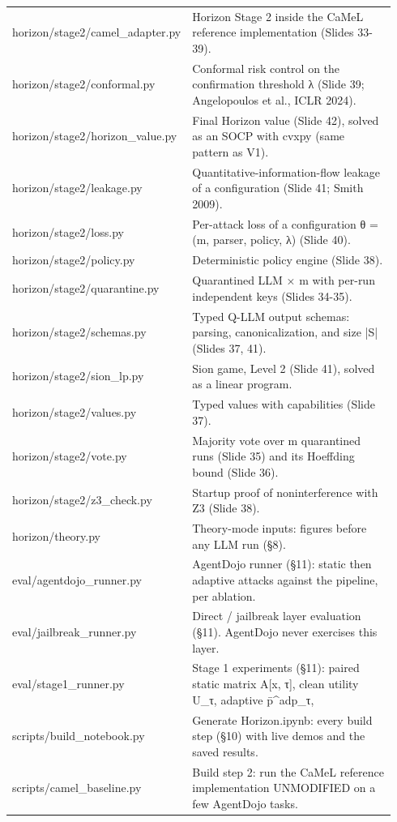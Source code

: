 \documentclass[11pt,a4paper]{article}
\begin{document}
\begin{small}
\begin{longtable}{p{0.36\linewidth}p{0.58\linewidth}}
horizon/stage2/camel\_adapter.py & Horizon Stage 2 inside the CaMeL reference implementation (Slides 33-39). \\
horizon/stage2/conformal.py & Conformal risk control on the confirmation threshold λ (Slide 39; Angelopoulos et al., ICLR 2024). \\
horizon/stage2/horizon\_value.py & Final Horizon value (Slide 42), solved as an SOCP with cvxpy (same pattern as V1). \\
horizon/stage2/leakage.py & Quantitative-information-flow leakage of a configuration (Slide 41; Smith 2009). \\
horizon/stage2/loss.py & Per-attack loss of a configuration θ = (m, parser, policy, λ) (Slide 40). \\
horizon/stage2/policy.py & Deterministic policy engine (Slide 38). \\
horizon/stage2/quarantine.py & Quarantined LLM × m with per-run independent keys (Slides 34-35). \\
horizon/stage2/schemas.py & Typed Q-LLM output schemas: parsing, canonicalization, and size |S| (Slides 37, 41). \\
horizon/stage2/sion\_lp.py & Sion game, Level 2 (Slide 41), solved as a linear program. \\
horizon/stage2/values.py & Typed values with capabilities (Slide 37). \\
horizon/stage2/vote.py & Majority vote over m quarantined runs (Slide 35) and its Hoeffding bound (Slide 36). \\
horizon/stage2/z3\_check.py & Startup proof of noninterference with Z3 (Slide 38). \\
horizon/theory.py & Theory-mode inputs: figures before any LLM run (§8). \\
eval/agentdojo\_runner.py & AgentDojo runner (§11): static then adaptive attacks against the pipeline, per ablation. \\
eval/jailbreak\_runner.py & Direct / jailbreak layer evaluation (§11). AgentDojo never exercises this layer. \\
eval/stage1\_runner.py & Stage 1 experiments (§11): paired static matrix A[x, τ], clean utility U\_τ, adaptive p̄\textasciicircum{}adp\_τ, \\
scripts/build\_notebook.py & Generate Horizon.ipynb: every build step (§10) with live demos and the saved results. \\
scripts/camel\_baseline.py & Build step 2: run the CaMeL reference implementation UNMODIFIED on a few AgentDojo tasks. \\

\end{longtable}
\end{small}
\end{document}
